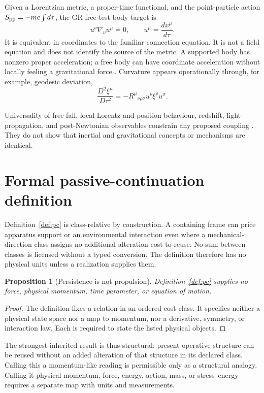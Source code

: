 \documentclass[11pt,a4paper]{article}
\newtheorem{proposition}[definition]{Proposition}
\theoremstyle{remark}
\begin{document}
Given a Lorentzian metric, a proper-time functional, and the point-particle
action $S_{\rm pp}=-mc\int d\tau$, the GR free-test-body target is
\[
 u^\nu\nabla_\nu u^\mu=0,
 \qquad u^\mu=\frac{dx^\mu}{d\tau}.
\]
It is equivalent in coordinates to the familiar connection equation. It is not
a field equation and does not identify the source of the metric. A supported
body has nonzero proper acceleration; a free body can have coordinate
acceleration without locally feeling a gravitational force
\citep{einstein1916,gerochjang1975}. Curvature appears operationally through,
for example, geodesic deviation,
\[
 \frac{D^2\xi^\mu}{D\tau^2}=-R^\mu{}_{\nu\rho\sigma}u^\nu\xi^\rho u^\sigma.
\]

Universality of free fall, local Lorentz and position behaviour, redshift,
light propagation, and post-Newtonian observables constrain any proposed
coupling \citep{will2014,wagner2012,touboul2022,bertotti2003}. They do not
show that inertial and gravitational concepts or mechanisms are identical.

\section{Formal passive-continuation definition}\label{sec:formal}
Definition~\ref{def:pc} is class-relative by construction. A containing frame
can price apparatus support or an environmental interaction even where a
mechanical-direction class assigns no additional alteration cost to reuse. No
sum between classes is licensed without a typed conversion. The definition
therefore has no physical units unless a realization supplies them.

\begin{proposition}[Persistence is not propulsion]\label{prop:notpropulsion}
Definition~\ref{def:pc} supplies no force, physical momentum, time parameter,
or equation of motion.
\end{proposition}
\begin{proof}
The definition fixes a relation in an ordered cost class. It specifies neither
a physical state space nor a map to momentum, nor a derivative, symmetry, or
interaction law. Each is required to state the listed physical objects.
\end{proof}

The strongest inherited result is thus structural: present operative structure
can be reused without an added alteration of that structure in its declared
class. Calling this a momentum-like reading is permissible only as a structural
analogy. Calling it physical momentum, force, energy, action, mass, or
stress--energy requires a separate map with units and measurements.
\end{document}
